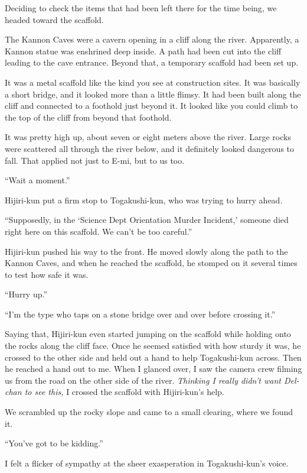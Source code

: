 \documentclass[
    a4paper,
    12pt,
    twoside,
    openany,
    UTF8,
    fontset=windows
]{ctexbook}
\begin{document}
Deciding to check the items that had been left there for the time being, we headed toward the scaffold.

The Kannon Caves were a cavern opening in a cliff along the river. Apparently, a Kannon statue was enshrined deep inside. A path had been cut into the cliff leading to the cave entrance. Beyond that, a temporary scaffold had been set up.

It was a metal scaffold like the kind you see at construction sites. It was basically a short bridge, and it looked more than a little flimsy. It had been built along the cliff and connected to a foothold just beyond it. It looked like you could climb to the top of the cliff from beyond that foothold.

It was pretty high up, about seven or eight meters above the river. Large rocks were scattered all through the river below, and it definitely looked dangerous to fall. That applied not just to E-mi, but to us too.

``Wait a moment.''

Hijiri-kun put a firm stop to Togakushi-kun, who was trying to hurry ahead.

``Supposedly, in the `Science Dept Orientation Murder Incident,' someone died right here on this scaffold. We can't be too careful.''

Hijiri-kun pushed his way to the front. He moved slowly along the path to the Kannon Caves, and when he reached the scaffold, he stomped on it several times to test how safe it was.

``Hurry up.''

``I'm the type who taps on a stone bridge over and over before crossing it.''

Saying that, Hijiri-kun even started jumping on the scaffold while holding onto the rocks along the cliff face. Once he seemed satisfied with how sturdy it was, he crossed to the other side and held out a hand to help Togakushi-kun across. Then he reached a hand out to me. When I glanced over, I saw the camera crew filming us from the road on the other side of the river. \textit{Thinking I really didn't want Del-chan to see this,} I crossed the scaffold with Hijiri-kun's help.

We scrambled up the rocky slope and came to a small clearing, where we found it.

``You've got to be kidding.''

I felt a flicker of sympathy at the sheer exasperation in Togakushi-kun's voice.
\end{document}
